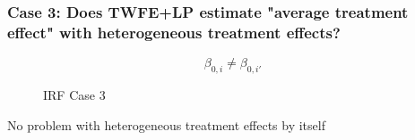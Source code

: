 \documentclass[notes,11pt, aspectratio = 169]{beamer}
\begin{document}
\begin{frame}\frametitle{Case 3: Does TWFE+LP estimate "average treatment effect" with heterogeneous treatment effects?}
    \[\beta_{0,i} \neq \beta_{0,i'}\] 

    \begin{figure}
        \centering
      \caption{IRF Case 3}
      \end{figure}
      
      No problem with heterogeneous treatment effects by itself

\end{frame}
\end{document}
